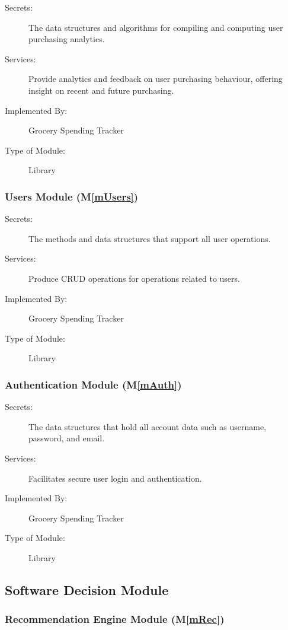 \documentclass[12pt, titlepage]{article}
\newcommand{\mref}[1]{M\ref{#1}}
\begin{document}
\begin{description}
\item[Secrets:] The data structures and algorithms for compiling and computing user purchasing analytics. 
\item[Services:] Provide analytics and feedback on user purchasing behaviour, offering insight on recent and future purchasing.
\item[Implemented By:] Grocery Spending Tracker
\item[Type of Module:] Library
\end{description}

\subsubsection{Users Module (\mref{mUsers})}

\begin{description}
\item[Secrets:] The methods and data structures that support all user operations.
\item[Services:] Produce CRUD operations for operations related to users.
\item[Implemented By:] Grocery Spending Tracker
\item[Type of Module:] Library
\end{description}

\subsubsection{Authentication Module (\mref{mAuth})}

\begin{description}
\item[Secrets:] The data structures that hold all account data such as username, password, and email.
\item[Services:] Facilitates secure user login and authentication.
\item[Implemented By:] Grocery Spending Tracker
\item[Type of Module:] Library
\end{description}

\subsection{Software Decision Module}

\subsubsection{Recommendation Engine Module (\mref{mRec})}
\end{document}
